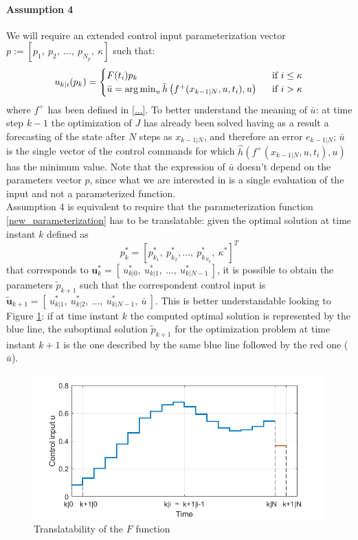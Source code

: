 \paragraph{Assumption 4}
We will require an extended control input parameterization vector $p:=[p_1,\ p_2,\ \dots,\ p_{N_p},\ \kappa]$ such that: 
\begin{equation}
\begin{split}\label{new_parameterization}
    u_{k|i}(p_k)=
        \begin{cases}
            F(t_i){p_k}\ \ \ \ \   &\textnormal{if } i\le\kappa \\
            \bar{u}=\arg \min_u \hat{h}\left(f^+(x_{k-1|N},u,t_i),u\right)\ \ &\textnormal{if } i> \kappa
        \end{cases}
    \end{split}
\end{equation} 
where $f^+$ has been defined in \ref{...}. To better understand the meaning of $\bar{u}$: at time step $k-1$ the optimization of $J$ has already been solved having as a result a forecasting of the state after $N$ steps as $x_{k-1|N}$, and therefore an error $e_{k-1|N}$; $\bar{u}$ is the single vector of the control commands for which $\hat{h}\left(f^+(x_{k-1|N},u,t_i),u\right)$ has the minimum value. Note that the expression of $\bar{u}$ doesn't depend on the parameters vector $p$, since what we are interested in is a single evaluation of the input and not a parameterized function.\\
Assumption 4 is equivalent to require that the parameterization function \ref{new_parameterization} has to be translatable: given the optimal solution at time instant $k$ defined as $$p_k^*=\left[ p_{k_1}^*,\ p_{k_2}^*,  \dots,\ p_{k_{N_p}}^*,\ \kappa^* \right]^T$$ that corresponds to $  \textbf{u}_k^*=[\ u_{k|0}^*,\ u_{k|1}^*,\  \dots,\  u_{k|{N-1}}^*\ ]$, it is possible to obtain the parameters $\tilde{p}_{k+1}$ such that the correspondent control input is $  \tilde{\textbf{u}}_{k+1}=[\ u_{k|1}^*,\ u_{k|2}^*,\  \dots,\  u_{k|{N-1}}^*,\ \bar{u} \ ]$. This is better understandable looking to Figure \ref{param_translatability}: if at time instant $k$ the computed optimal solution is represented by the blue line, the suboptimal solution $\tilde{p}_{k+1}$ for the optimization problem at time instant $k+1$ is the one described by the same blue line followed by the red one ($\bar{u}$).
\begin{figure}[h!]
	\centering
	\includegraphics[scale=0.6]{IMMAGINI/trans_u.png}
	\caption{Translatability of the $F$ function}
	\label{param_translatability}
\end{figure}

